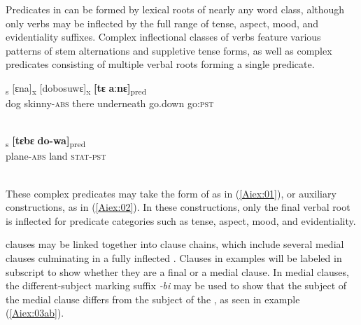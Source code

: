 \documentclass[output=paper]{LSP/langsci}
\begin{document}
Predicates in  can be formed by lexical roots of nearly any word class, although only verbs may be inflected by the full range of tense, aspect, mood, and evidentiality suffixes. Complex inflectional classes of verbs feature various patterns of stem alternations and suppletive tense forms, as well as complex predicates consisting of multiple verbal roots forming a single predicate. 

\begin{exe}
\ex \label{Aiex:01}
\textsubscript{s} [ɛna]\textsubscript{x} [dobosuwɛ]\textsubscript{x} \textbf{[tɛ} 	\textbf{aːnɛ]}\textsubscript{pred}\\
dog	skinny-\textsc{abs}	there	underneath	go.down 	go\textsc{:pst}\\
\glt {}\\
\end{exe}


\begin{exe}
\ex \label{Aiex:02}
\gll [sobolo-wa]\textsubscript{s} \textbf{[tɛbɛ} 	 \textbf{do-wa]}\textsubscript{pred}\\
plane-\textsc{abs}	land	\textsc{stat}-\textsc{pst}\\
\glt {}\\
\end{exe}



These complex predicates may take the form of  as in (\ref{Aiex:01}), or auxiliary constructions, as in (\ref{Aiex:02}). In these constructions, only the final verbal root is inflected for predicate categories such as tense, aspect, mood, and evidentiality.

 clauses may be linked together into clause chains, which include several medial clauses culminating in a fully inflected . Clauses in examples will be labeled in subscript to show whether they are a final or a medial clause. In medial clauses, the different-subject marking suffix \textit{‑bi} may be used to show that the subject of the medial clause differs from the subject of the , as seen in example (\ref{Aiex:03ab}).
\end{document}
